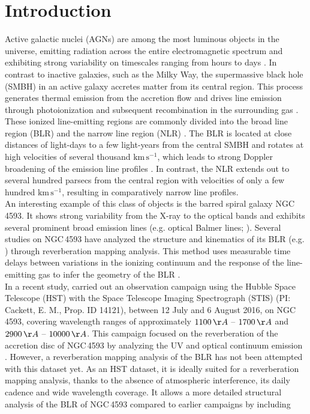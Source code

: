 \chapter{Introduction}


Active galactic nuclei (AGNs) are among the most luminous objects in the universe, emitting radiation across the entire electromagnetic spectrum \parencite{netzer2013agn} and exhibiting strong variability on timescales ranging from hours to days \parencite{Ulrich1997}. In contrast to inactive galaxies, such as the Milky Way, the supermassive black hole (SMBH) in an active galaxy accretes matter from its central region. This process generates thermal emission from the accretion flow \parencite{peterson1997introduction} and drives line emission through photoionization and subsequent recombination in the surrounding gas \parencite{netzer2013agn}. These ionized line-emitting regions are commonly divided into the broad line region (BLR) and the narrow line region (NLR) \parencite{peterson1997introduction}. The BLR is located at close distances of light-days to a few light-years from the central SMBH \parencite{goadBroadLine} and rotates at high velocities of several thousand $\mathrm{km\,s^{-1}}$, which leads to strong Doppler broadening of the emission line profiles \parencite{peterson1997introduction}. In contrast, the NLR extends out to several hundred parsecs from the central region \parencite{peterson1997introduction} with velocities of only a few hundred $\mathrm{km\,s^{-1}}$, resulting in comparatively narrow line profiles.\\ An interesting example of this class of objects is the barred spiral galaxy NGC\,4593. It shows strong variability from the X-ray to the optical bands \parencite{mchardy2017ngc4593, cackett2018accretion} and exhibits several prominent broad emission lines (e.g. optical Balmer lines; \cite{kollatschny1997balmer}). Several studies on NGC\,4593 have analyzed the structure and kinematics of its BLR (e.g. \cite{kollatschny1997balmer, denney2006ngc4593}) through reverberation mapping analysis. This method uses measurable time delays between variations in the ionizing continuum and the response of the line-emitting gas to infer the geometry of the BLR \parencite{peterson1993}.\\ In a recent study, \cite{cackett2018accretion} carried out an observation campaign using the Hubble Space Telescope (HST) with the Space Telescope Imaging Spectrograph (STIS) (PI: Cackett, E. M., Prop. ID 14121), between 12 July and 6 August 2016, on NGC\,4593, covering wavelength ranges of approximately  $1100\,\AA$ -- $1700\,\AA$ and $2900\,\AA$ -- $10000\,\AA$. This campaign focused on the reverberation of the accretion disc of NGC\,4593 by analyzing the UV and optical continuum emission \parencite{cackett2018accretion}. However, a reverberation mapping analysis of the BLR has not been attempted with this dataset yet. As an HST dataset, it is ideally suited for a reverberation mapping analysis, thanks to the absence of atmospheric interference, its daily cadence and wide wavelength coverage. It allows a more detailed structural analysis of the BLR of NGC\,4593 compared to earlier campaigns \parencite{kollatschny1997balmer, denney2006ngc4593, Williams_2018} by including 